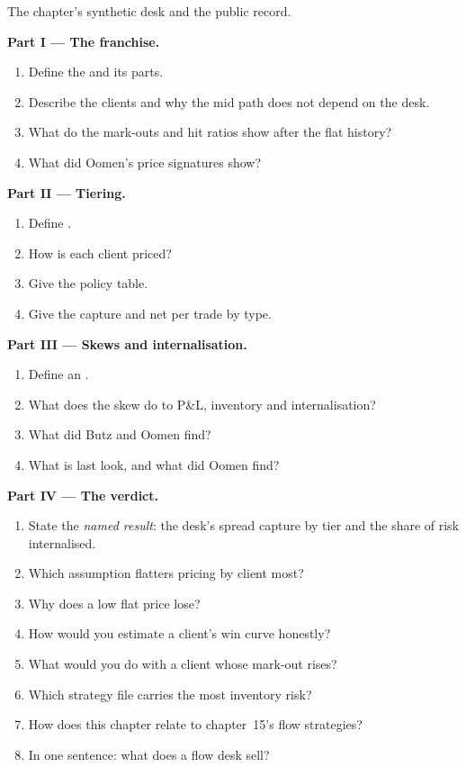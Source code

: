 \begin{problem}\label{pb:s2:flow-market-making-at-a-bank:1}
The chapter's synthetic desk and the public record.

\medskip\noindent\textbf{Part I --- The franchise.}
\begin{enumerate}
\item Define the  and its parts.
\item Describe the clients and why the mid path does not depend on the desk.
\item What do the mark-outs and hit ratios show after the flat history?
\item What did Oomen's price signatures show?
\end{enumerate}

\medskip\noindent\textbf{Part II --- Tiering.}
\begin{enumerate}[resume]
\item Define .
\item How is each client priced?
\item Give the policy table.
\item Give the capture and net per trade by type.
\end{enumerate}

\medskip\noindent\textbf{Part III --- Skews and internalisation.}
\begin{enumerate}[resume]
\item Define an .
\item What does the skew do to P\&L, inventory and internalisation?
\item What did Butz and Oomen find?
\item What is last look, and what did Oomen find?
\end{enumerate}

\medskip\noindent\textbf{Part IV --- The verdict.}
\begin{enumerate}[resume]
\item State the \emph{named result}: the desk's spread capture by tier and the share of risk internalised.
\item Which assumption flatters pricing by client most?
\item Why does a low flat price lose?
\item How would you estimate a client's win curve honestly?
\item What would you do with a client whose mark-out rises?
\item Which strategy file carries the most inventory risk?
\item How does this chapter relate to chapter~15's flow strategies?
\item In one sentence: what does a flow desk sell?
\end{enumerate}
\end{problem}

